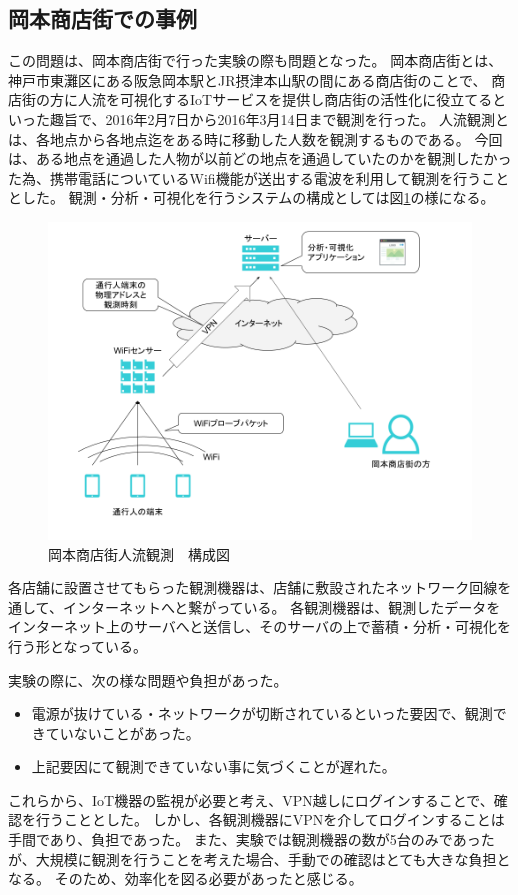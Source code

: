 \subsection{岡本商店街での事例}
この問題は、岡本商店街で行った実験の際も問題となった。
岡本商店街とは、神戸市東灘区にある阪急岡本駅とJR摂津本山駅の間にある商店街のことで、
商店街の方に人流を可視化するIoTサービスを提供し商店街の活性化に役立てるといった趣旨で、2016年2月7日から2016年3月14日まで観測を行った。
人流観測とは、各地点から各地点迄をある時に移動した人数を観測するものである。
今回は、ある地点を通過した人物が以前どの地点を通過していたのかを観測したかった為、携帯電話についているWifi機能が送出する電波を利用して観測を行うこととした。
観測・分析・可視化を行うシステムの構成としては図\ref{fig:okamoto_diag1}の様になる。
\begin{figure}[htbp]
\includegraphics[width=16cm]{images/okamoto_diag1.png}
\caption{岡本商店街人流観測　構成図}
\label{fig:okamoto_diag1}
\end{figure}
各店舗に設置させてもらった観測機器は、店舗に敷設されたネットワーク回線を通して、インターネットへと繋がっている。
各観測機器は、観測したデータをインターネット上のサーバへと送信し、そのサーバの上で蓄積・分析・可視化を行う形となっている。

実験の際に、次の様な問題や負担があった。
\begin{itemize}
\item 電源が抜けている・ネットワークが切断されているといった要因で、観測できていないことがあった。
\item 上記要因にて観測できていない事に気づくことが遅れた。
\end{itemize}
これらから、IoT機器の監視が必要と考え、VPN越しにログインすることで、確認を行うこととした。
しかし、各観測機器にVPNを介してログインすることは手間であり、負担であった。
また、実験では観測機器の数が5台のみであったが、大規模に観測を行うことを考えた場合、手動での確認はとても大きな負担となる。
そのため、効率化を図る必要があったと感じる。

